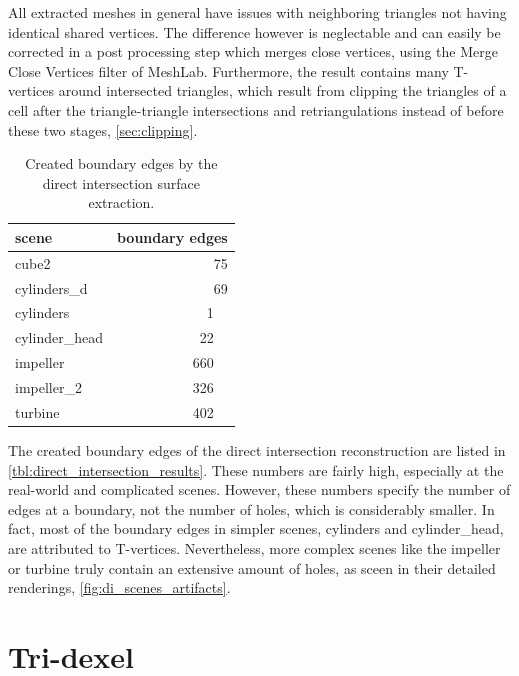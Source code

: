 All extracted meshes in general have issues with neighboring triangles not having identical shared vertices.
The difference however is neglectable and can easily be corrected in a post processing step which merges close vertices, \eg using the Merge Close Vertices filter of MeshLab.
Furthermore, the result contains many T-vertices around intersected triangles, which result from clipping the triangles of a cell after the triangle-triangle intersections and retriangulations instead of before these two stages, \cf \cref{sec:clipping}.

\begin{table}
	\centering
	\begin{tabular}{l|r}
		scene          &  boundary edges         \\
		\midrule
		cube2          & \SI{ 75}{     \nothing} \\
		cylinders\_d   & \SI{ 69}{     \nothing} \\
		cylinders      & \SI{  1}{\kilo\nothing} \\ %
		cylinder\_head & \SI{ 22}{\kilo\nothing} \\ %
		impeller       & \SI{660}{\kilo\nothing} \\ %
		impeller\_2    & \SI{326}{\kilo\nothing} \\ %
		turbine        & \SI{402}{\kilo\nothing} \\ %
	\end{tabular}
	\caption{
		Created boundary edges by the direct intersection surface extraction.
	}
	\label{tbl:direct_intersection_boundary edges}
\end{table}
%
The created boundary edges of the direct intersection reconstruction are listed in \cref{tbl:direct_intersection_results}.
These numbers are fairly high, especially at the real-world and complicated scenes.
However, these numbers specify the number of edges at a boundary, not the number of holes, which is considerably smaller.
In fact, most of the boundary edges in simpler scenes, \eg cylinders and cylinder\_head, are attributed to T-vertices.
Nevertheless, more complex scenes like the impeller or turbine truly contain an extensive amount of holes, as sceen in their detailed renderings, \cf \cref{fig:di_scenes_artifacts}.

\section{Tri-dexel}
\label{sec:tri_dexel_results}

